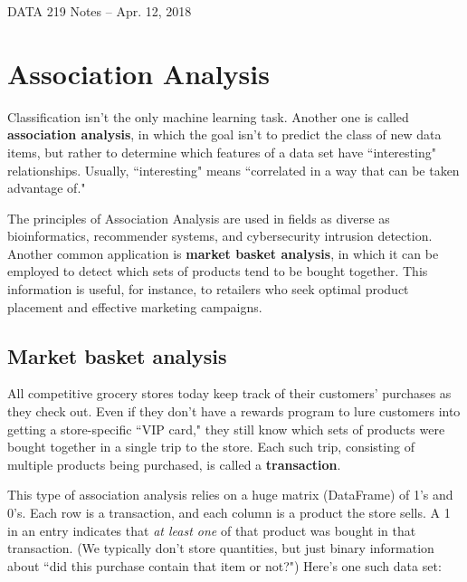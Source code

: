 \documentclass[12pt]{article}
\begin{document}
\begin{center}
\begin{Large}
DATA 219 Notes -- Apr. 12, 2018
\end{Large}
\end{center}

\section{Association Analysis}

Classification isn't the only machine learning task. Another one is called
\textbf{association analysis}, in which the goal isn't to predict the class of
new data items, but rather to determine which features of a data set have
``interesting" relationships. Usually, ``interesting" means ``correlated in a
way that can be taken advantage of."

The principles of Association Analysis are used in fields as diverse as
bioinformatics, recommender systems, and cybersecurity intrusion detection.
Another common application is \textbf{market basket analysis}, in which it can
be employed to detect which sets of products tend to be bought together. This
information is useful, for instance, to retailers who seek optimal product
placement and effective marketing campaigns.

\subsection{Market basket analysis}

All competitive grocery stores today keep track of their customers' purchases
as they check out. Even if they don't have a rewards program to lure customers
into getting a store-specific ``VIP card," they still know which sets of
products were bought together in a single trip to the store. Each such trip,
consisting of multiple products being purchased, is called a
\textbf{transaction}.

This type of association analysis relies on a huge matrix (DataFrame) of 1's
and 0's. Each row is a transaction, and each column is a product the store
sells. A 1 in an entry indicates that \textit{at least one} of that product
was bought in that transaction. (We typically don't store quantities, but just
binary information about ``did this purchase contain that item or not?")
Here's one such data set:
\end{document}

